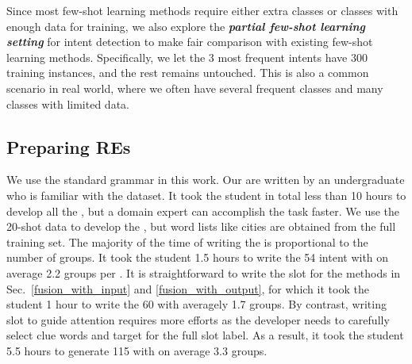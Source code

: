 Since most few-shot learning methods require either extra classes or classes with enough data for training, we also explore the
\textbf{\emph{partial few-shot learning setting}} for intent detection to make fair comparison with existing few-shot learning methods.
Specifically, we let the 3 most frequent intents have 300 training instances, and the rest remains untouched.
This is also a common scenario in real world, where we often have several frequent classes and many classes with limited data.

\subsection{Preparing REs}
\label{re_in_exp} We use the standard \RE grammar in this work. Our \REs are written by an undergraduate who is familiar with the
dataset.
It took the student in total less than 10 hours
to develop all the \REs, but a domain expert can accomplish the task faster. We use the 20-shot data to develop the \REs, but word lists
like cities are obtained from the full training set. The majority of the time 
of %
writing the \REs is proportional to the number of
\RE groups. It took the student 1.5 hours to write the 54 intent \REs with on average 2.2 groups per \RE. It is straightforward
to write the slot \REs for the methods in Sec.~\ref{fusion_with_input} and \ref{fusion_with_output}, for which it took the
student 1 hour to write the 60 \REs with averagely 1.7 groups. By contrast, writing slot \REs to guide attention requires more
efforts as the developer needs to carefully select clue words and target for the full slot label. As a result, it took the student 5.5 hours
to generate 115 \REs with on average 3.3 groups.


